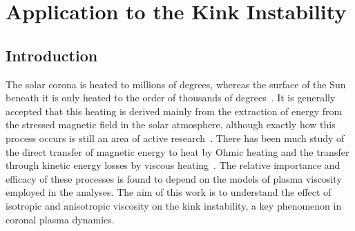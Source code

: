 \chapter{Application to the Kink Instability}

\graphicspath{{images/kink_instability/}}

\section{Introduction}

The solar corona is heated to millions of degrees, whereas the surface of the Sun beneath it is only heated to the order of thousands of degrees~\cite{mandriniMagneticFieldPlasma2000}. It is generally accepted that this heating is derived mainly from the extraction of energy from the stressed magnetic field in the solar atmosphere, although exactly how this process occurs is still an area of active research~\cite{klimchukSolvingCoronalHeating2006}. There has been much study of the direct transfer of magnetic energy to heat by Ohmic heating and the transfer through kinetic energy losses by viscous heating~\cite{klimchukSolvingCoronalHeating2006,browningMechanismsSolarCoronal1991}. The relative importance and efficacy of these processes is found to depend on the models of plasma viscosity employed in the analyses. The aim of this work is to understand the effect of isotropic and anisotropic viscosity on the kink instability, a key phenomenon in coronal plasma dynamics.

